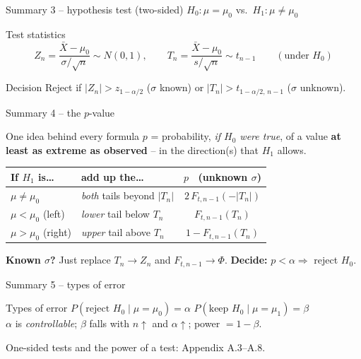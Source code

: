 \documentclass[aspectratio=169,11pt]{beamer}
\begin{document}
\begin{frame}{Summary 3 -- hypothesis test (two-sided)}
  $H_0:\mu=\mu_0$ vs.\ $H_1:\mu\ne\mu_0$
  \begin{block}{Test statistics}
    \[
      Z_n = \frac{\bar{X}-\mu_0}{\sigma/\sqrt{n}}\sim N(0,1),\qquad
      T_n = \frac{\bar{X}-\mu_0}{s/\sqrt{n}}\sim t_{n-1}
      \qquad(\text{under } H_0)
    \]
  \end{block}
  \begin{alertblock}{Decision}
    Reject if $|Z_n|>z_{1-\alpha/2}$ ($\sigma$ known) or
    $|T_n|>t_{1-\alpha/2,\,n-1}$ ($\sigma$ unknown).
  \end{alertblock}
\end{frame}

\begin{frame}{Summary 4 -- the $p$-value}
  \begin{block}{One idea behind every formula}
    $p$ = probability, \emph{if $H_0$ were true}, of a value \textbf{at least as
    extreme as observed} -- in the direction(s) that $H_1$ allows.
  \end{block}
  \begin{center}
    \renewcommand{\arraystretch}{1.4}
    \begin{tabular}{>{\raggedright\arraybackslash}p{2.6cm}>{\raggedright\arraybackslash}p{4.2cm}c}
      \toprule
      \textbf{If $H_1$ is\ldots} & \textbf{add up the\ldots} & \textbf{$p$ \ (unknown $\sigma$)}\\
      \midrule
      $\mu\neq\mu_0$ & \emph{both} tails beyond $|T_n|$ & $2\,F_{t,n-1}(-|T_n|)$\\
      $\mu<\mu_0$ (left)  & \emph{lower} tail below $T_n$ & $F_{t,n-1}(T_n)$\\
      $\mu>\mu_0$ (right) & \emph{upper} tail above $T_n$ & $1-F_{t,n-1}(T_n)$\\
      \bottomrule
    \end{tabular}
  \end{center}
  \footnotesize \textbf{Known $\sigma$?} Just replace $T_n\to Z_n$ and
  $F_{t,n-1}\to\Phi$. \quad \textbf{Decide:} $p<\alpha \Rightarrow$ reject $H_0$.
\end{frame}

\begin{frame}{Summary 5 -- types of error}
  \begin{block}{Types of error}
    $P(\text{reject } H_0\mid \mu=\mu_0)= \alpha$ \quad
    $P(\text{keep } H_0\mid \mu=\mu_1)= \beta$ \\
    $\alpha$ is \emph{controllable}; $\beta$ falls with $n\uparrow$ and $\alpha\uparrow$;
    power $=1-\beta$.
  \end{block}
  {\footnotesize One-sided tests and the power of a test: Appendix A.3--A.8.\par}
\end{frame}
\end{document}
